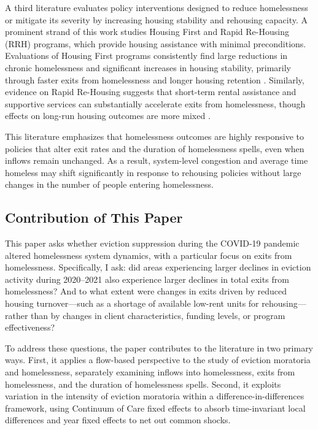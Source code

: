 \documentclass[12pt]{article}
\begin{document}
A third literature evaluates policy interventions designed to reduce homelessness or mitigate its severity by increasing housing stability and rehousing capacity. A prominent strand of this work studies Housing First and Rapid Re-Housing (RRH) programs, which provide housing assistance with minimal preconditions. Evaluations of Housing First programs consistently find large reductions in chronic homelessness and significant increases in housing stability, primarily through faster exits from homelessness and longer housing retention \citep{tsai2010, tsemberis2004}. Similarly, evidence on Rapid Re-Housing suggests that short-term rental assistance and supportive services can substantially accelerate exits from homelessness, though effects on long-run housing outcomes are more mixed \citep{gubits2016}.

This literature emphasizes that homelessness outcomes are highly responsive to policies that alter exit rates and the duration of homelessness spells, even when inflows remain unchanged. As a result, system-level congestion and average time homeless may shift significantly in response to rehousing policies without large changes in the number of people entering homelessness.


\subsection{Contribution of This Paper}

This paper asks whether eviction suppression during the COVID-19 pandemic altered homelessness system dynamics, with a particular focus on exits from homelessness. Specifically, I ask: did areas experiencing larger declines in eviction activity during 2020–2021 also experience larger declines in total exits from homelessness? And to what extent were changes in exits driven by reduced housing turnover—such as a shortage of available low-rent units for rehousing—rather than by changes in client characteristics, funding levels, or program effectiveness?

To address these questions, the paper contributes to the literature in two primary ways. First, it applies a flow-based perspective to the study of eviction moratoria and homelessness, separately examining inflows into homelessness, exits from homelessness, and the duration of homelessness spells. Second, it exploits variation in the intensity of eviction moratoria within a difference-in-differences framework, using Continuum of Care fixed effects to absorb time-invariant local differences and year fixed effects to net out common shocks. 
\end{document}
